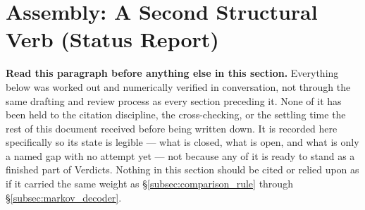 \documentclass[12pt, a4paper]{article}
\begin{document}
\section{Assembly: A Second Structural Verb (Status Report)}
\label{sec:assembly_status}

\textbf{Read this paragraph before anything else in this section.}
Everything below was worked out and numerically verified in
conversation, not through the same drafting and review process as
every section preceding it. None of it has been held to the citation
discipline, the cross-checking, or the settling time the rest of this
document received before being written down. It is recorded here
specifically so its state is legible --- what is closed, what is
open, and what is only a named gap with no attempt yet --- not
because any of it is ready to stand as a finished part of Verdicts.
Nothing in this section should be cited or relied upon as if it
carried the same weight as \S\ref{subsec:comparison_rule} through
\S\ref{subsec:markov_decoder}.
\end{document}
